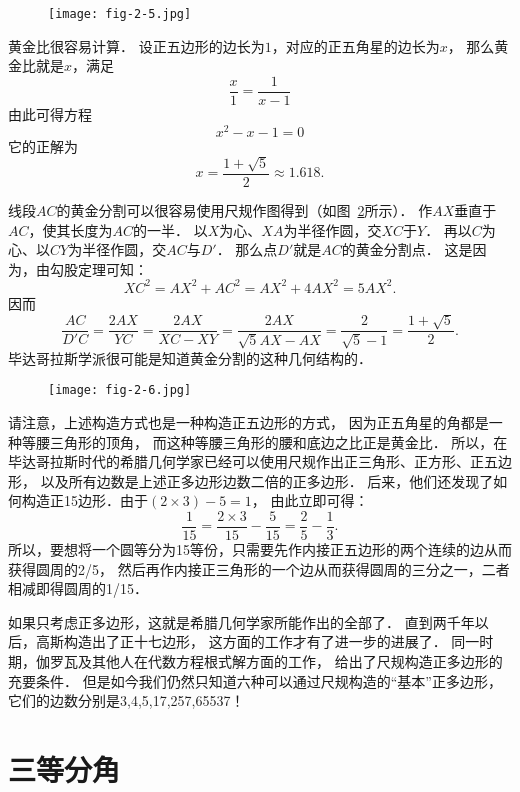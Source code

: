 \documentclass[cn,fancy,blue,11pt]{elegantbook}
\begin{document}
\begin{figure}[htbp]
	\centering
	\texttt{[image: fig-2-5.jpg]}
	\caption{\label{fig:2-5}}
\end{figure}

黄金比很容易计算．
设正五边形的边长为$1$，对应的正五角星的边长为$x$，
那么黄金比就是$x$，满足
\[\frac{x}{1}=\frac{1}{x-1}\]
由此可得方程\[x^2-x-1=0\]
它的正解为
\[x=\frac{1+\sqrt{5}}{2}\approx 1.618.\]

线段$AC$的黄金分割可以很容易使用尺规作图得到（如图~\ref{fig:2-6}所示）．
作$AX$垂直于$AC$，使其长度为$AC$的一半．
以$X$为心、$XA$为半径作圆，交$XC$于$Y$．
再以$C$为心、以$CY$为半径作圆，交$AC$与$D'$．
那么点$D'$就是$AC$的黄金分割点．
这是因为，由勾股定理可知：
\[XC^2=AX^2+AC^2=AX^2+4AX^2=5AX^2.\]
因而
\[\frac{AC}{D'C}=\frac{2AX}{YC}=\frac{2AX}{XC-XY}=\frac{2AX}{\sqrt{5}AX-AX}
=\frac{2}{\sqrt{5}-1}=\frac{1+\sqrt{5}}{2}.\]
毕达哥拉斯学派很可能是知道黄金分割的这种几何结构的．

\begin{figure}[htbp]
	\centering
	\texttt{[image: fig-2-6.jpg]}
	\caption{\label{fig:2-6}}
\end{figure}

请注意，上述构造方式也是一种构造正五边形的方式，
因为正五角星的角都是一种等腰三角形的顶角，
而这种等腰三角形的腰和底边之比正是黄金比．
所以，在毕达哥拉斯时代的希腊几何学家已经可以使用尺规作出正三角形、正方形、正五边形，
以及所有边数是上述正多边形边数二倍的正多边形．
后来，他们还发现了如何构造正15边形．由于$(2\times 3)-5=1$，
由此立即可得：
\[\frac{1}{15}=\frac{2\times3}{15}-\frac{5}{15}=\frac{2}{5}-\frac{1}{3}.\]
所以，要想将一个圆等分为15等份，只需要先作内接正五边形的两个连续的边从而获得圆周的2/5，
然后再作内接正三角形的一个边从而获得圆周的三分之一，二者相减即得圆周的1/15．

如果只考虑正多边形，这就是希腊几何学家所能作出的全部了．
直到两千年以后，高斯构造出了正十七边形，
这方面的工作才有了进一步的进展了．
同一时期，伽罗瓦及其他人在代数方程根式解方面的工作，
给出了尺规构造正多边形的充要条件．
但是如今我们仍然只知道六种可以通过尺规构造的``基本''正多边形，
它们的边数分别是3,4,5,17,257,65537！

\section{三等分角}
\end{document}
